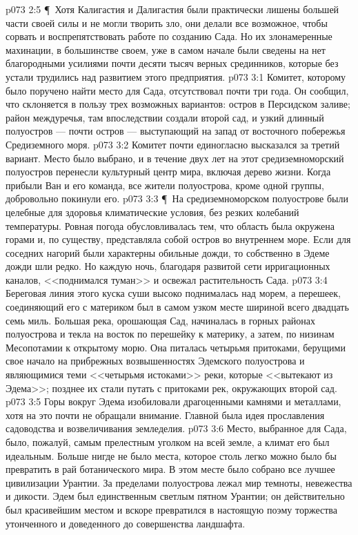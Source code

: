 \vs p073 2:5 \P\ Хотя Калигастия и Далигастия были практически лишены большей части своей силы и не могли творить зло, они делали все возможное, чтобы сорвать и воспрепятствовать работе по созданию Сада. Но их злонамеренные махинации, в большинстве своем, уже в самом начале были сведены на нет благородными усилиями почти десяти тысяч верных срединников, которые без устали трудились над развитием этого предприятия.
\vs p073 3:1 Комитет, которому было поручено найти место для Сада, отсутствовал почти три года. Он сообщил, что склоняется в пользу трех возможных вариантов: остров в Персидском заливе; район междуречья, там впоследствии создали второй сад, и узкий длинный полуостров --- почти остров --- выступающий на запад от восточного побережья Средиземного моря.
\vs p073 3:2 Комитет почти единогласно высказался за третий вариант. Место было выбрано, и в течение двух лет на этот средиземноморский полуостров перенесли культурный центр мира, включая дерево жизни. Когда прибыли Ван и его команда, все жители полуострова, кроме одной группы, добровольно покинули его.
\vs p073 3:3 \P\ На средиземноморском полуострове были целебные для здоровья климатические условия, без резких колебаний температуры. Ровная погода обусловливалась тем, что область была окружена горами и, по существу, представляла собой остров во внутреннем море. Если для соседних нагорий были характерны обильные дожди, то собственно в Эдеме дожди шли редко. Но каждую ночь, благодаря развитой сети ирригационных каналов, <<поднимался туман>> и освежал растительность Сада.
\vs p073 3:4 Береговая линия этого куска суши высоко поднималась над морем, а перешеек, соединяющий его с материком был в самом узком месте шириной всего двадцать семь миль. Большая река, орошающая Сад, начиналась в горных районах полуострова и текла на восток по перешейку к материку, а затем, по низинам Месопотамии к открытому морю. Она питалась четырьмя притоками, берущими свое начало на прибрежных возвышенностях Эдемского полуострова и являющимися теми <<четырьмя истоками>> реки, которые <<вытекают из Эдема>>; позднее их стали путать с притоками рек, окружающих второй сад.
\vs p073 3:5 Горы вокруг Эдема изобиловали драгоценными камнями и металлами, хотя на это почти не обращали внимание. Главной была идея прославления садоводства и возвеличивания земледелия.
\vs p073 3:6 Место, выбранное для Сада, было, пожалуй, самым прелестным уголком на всей земле, а климат его был идеальным. Больше нигде не было места, которое столь легко можно было бы превратить в рай ботанического мира. В этом месте было собрано все лучшее цивилизации Урантии. За пределами полуострова лежал мир темноты, невежества и дикости. Эдем был единственным светлым пятном Урантии; он действительно был красивейшим местом и вскоре превратился в настоящую поэму торжества утонченного и доведенного до совершенства ландшафта.
